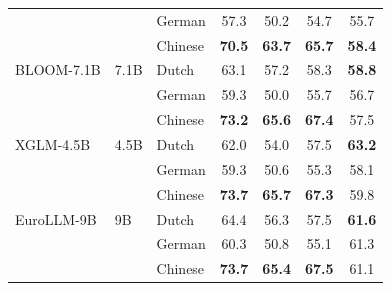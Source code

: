 \begin{table}[t]
\begin{minipage}[t]{0.49\linewidth}
\begin{tabular}{ll l cccc}
 &  & German & \cellcolor[rgb]{0.924,1.000,0.924} 57.3 & \cellcolor[rgb]{0.997,1.000,0.997} 50.2 & \cellcolor[rgb]{0.938,1.000,0.938} 54.7 & \cellcolor[rgb]{0.883,1.000,0.883} 55.7 \\
 &  & Chinese & \cellcolor[rgb]{0.786,1.000,0.786} \textbf{70.5} & \cellcolor[rgb]{0.827,1.000,0.827} \textbf{63.7} & \cellcolor[rgb]{0.792,1.000,0.792} \textbf{65.7} & \cellcolor[rgb]{0.828,1.000,0.828} \textbf{58.4} \\
\addlinespace[2pt]
BLOOM-7.1B & 7.1B & Dutch & \cellcolor[rgb]{0.863,1.000,0.863} 63.1 & \cellcolor[rgb]{0.909,1.000,0.909} 57.2 & \cellcolor[rgb]{0.890,1.000,0.890} 58.3 & \cellcolor[rgb]{0.820,1.000,0.820} \textbf{58.8} \\
 &  & German & \cellcolor[rgb]{0.903,1.000,0.903} 59.3 & \cellcolor[rgb]{0.999,1.000,0.999} 50.0 & \cellcolor[rgb]{0.925,1.000,0.925} 55.7 & \cellcolor[rgb]{0.863,1.000,0.863} 56.7 \\
 &  & Chinese & \cellcolor[rgb]{0.758,1.000,0.758} \textbf{73.2} & \cellcolor[rgb]{0.803,1.000,0.803} \textbf{65.6} & \cellcolor[rgb]{0.770,1.000,0.770} \textbf{67.4} & \cellcolor[rgb]{0.847,1.000,0.847} 57.5 \\
\addlinespace[2pt]
XGLM-4.5B & 4.5B & Dutch & \cellcolor[rgb]{0.875,1.000,0.875} 62.0 & \cellcolor[rgb]{0.950,1.000,0.950} 54.0 & \cellcolor[rgb]{0.901,1.000,0.901} 57.5 & \cellcolor[rgb]{0.730,1.000,0.730} \textbf{63.2} \\
 &  & German & \cellcolor[rgb]{0.903,1.000,0.903} 59.3 & \cellcolor[rgb]{0.992,1.000,0.992} 50.6 & \cellcolor[rgb]{0.930,1.000,0.930} 55.3 & \cellcolor[rgb]{0.834,1.000,0.834} 58.1 \\
 &  & Chinese & \cellcolor[rgb]{0.753,1.000,0.753} \textbf{73.7} & \cellcolor[rgb]{0.802,1.000,0.802} \textbf{65.7} & \cellcolor[rgb]{0.771,1.000,0.771} \textbf{67.3} & \cellcolor[rgb]{0.800,1.000,0.800} 59.8 \\
\addlinespace[2pt]
EuroLLM-9B & 9B & Dutch & \cellcolor[rgb]{0.850,1.000,0.850} 64.4 & \cellcolor[rgb]{0.921,1.000,0.921} 56.3 & \cellcolor[rgb]{0.901,1.000,0.901} 57.5 & \cellcolor[rgb]{0.763,1.000,0.763} \textbf{61.6} \\
 &  & German & \cellcolor[rgb]{0.893,1.000,0.893} 60.3 & \cellcolor[rgb]{0.990,1.000,0.990} 50.8 & \cellcolor[rgb]{0.932,1.000,0.932} 55.1 & \cellcolor[rgb]{0.769,1.000,0.769} 61.3 \\
 &  & Chinese & \cellcolor[rgb]{0.753,1.000,0.753} \textbf{73.7} & \cellcolor[rgb]{0.806,1.000,0.806} \textbf{65.4} & \cellcolor[rgb]{0.768,1.000,0.768} \textbf{67.5} & \cellcolor[rgb]{0.773,1.000,0.773} 61.1 \\

\end{tabular}
\end{minipage}
\end{table}
